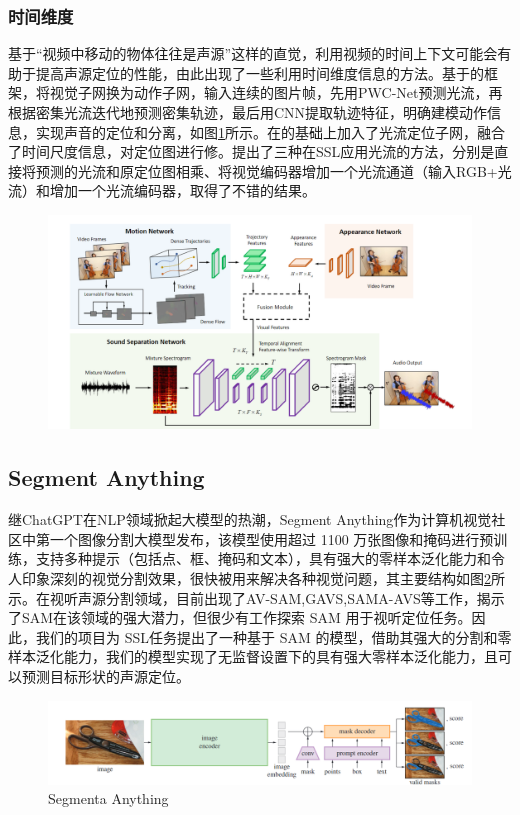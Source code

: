 \documentclass[12pt]{article}
\begin{document}
\subsubsection{时间维度}
基于“视频中移动的物体往往是声源”这样的直觉，利用视频的时间上下文可能会有助于提高声源定位的性能，由此出现了一些利用时间维度信息的方法。\cite{8}基于\cite{4}的框架，将视觉子网换为动作子网，输入连续的图片帧，先用PWC-Net预测光流，再根据密集光流迭代地预测密集轨迹，最后用CNN提取轨迹特征，明确建模动作信息，实现声音的定位和分离，如图\ref{ref4}所示。\cite{28}在\cite{10}的基础上加入了光流定位子网，融合了时间尺度信息，对定位图进行修。\cite{33}提出了三种在SSL应用光流的方法，分别是直接将预测的光流和原定位图相乘、将视觉编码器增加一个光流通道（输入RGB+光流）和增加一个光流编码器，取得了不错的结果。
\begin{figure}[!h]
  \centering
  \includegraphics[width=0.7\linewidth]{9.png}
  \caption{\cite{8}}
  \label{ref4}
\end{figure}

\subsection{Segment Anything}

继ChatGPT在NLP领域掀起大模型的热潮，Segment Anything\cite{sam}作为计算机视觉社区中第一个图像分割大模型发布，该模型使用超过 1100 万张图像和掩码进行预训练，支持多种提示（包括点、框、掩码和文本），具有强大的零样本泛化能力和令人印象深刻的视觉分割效果，很快被用来解决各种视觉问题，其主要结构如图\ref{ref6}所示。在视听声源分割领域，目前出现了AV-SAM\cite{s1},GAVS\cite{s6},SAMA-AVS\cite{9}等工作，揭示了SAM在该领域的强大潜力，但很少有工作探索 SAM 用于视听定位任务。因此，我们的项目为 SSL任务提出了一种基于 SAM 的模型，借助其强大的分割和零样本泛化能力，我们的模型实现了无监督设置下的具有强大零样本泛化能力，且可以预测目标形状的声源定位。
\begin{figure}[!h]
  \centering
  \centering
  \includegraphics[width=1\linewidth]{12.png}

  \caption{Segmenta Anything\cite{sam}}
\label{ref6}
\end{figure}
\end{document}
